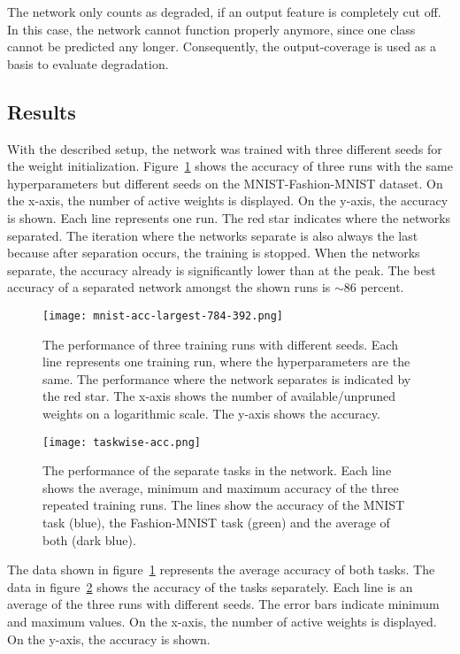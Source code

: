 The network only counts as degraded, if an output feature is completely cut off.
In this case, the network cannot function properly anymore, since one class cannot be predicted any longer.
Consequently, the output-coverage is used as a basis to evaluate degradation.

\subsection{Results}
With the described setup, the network was trained with three different seeds for the weight initialization.
Figure~\ref{fig:mnist-acc} shows the accuracy of three runs with the same hyperparameters but different seeds on the MNIST-Fashion-MNIST dataset.
On the x-axis, the number of active weights is displayed.
On the y-axis, the accuracy is shown.
Each line represents one run.
The red star indicates where the networks separated.
The iteration where the networks separate is also always the last because after separation occurs, the training is stopped.
When the networks separate, the accuracy already is significantly lower than at the peak.
The best accuracy of a separated network amongst the shown runs is $\sim86$ percent.

\begin{figure}
    \centering
    \texttt{[image: mnist-acc-largest-784-392.png]}
    \caption[Performance and Separation on MNIST-Fashion-MNIST]{The performance of three training runs with different seeds. 
    Each line represents one training run, where the hyperparameters are the same.
    The performance where the network separates is indicated by the red star.
    The x-axis shows the number of available/unpruned weights on a logarithmic scale.
    The y-axis shows the accuracy.
    }\label{fig:mnist-acc}
\end{figure}

\begin{figure}
    \centering
    \texttt{[image: taskwise-acc.png]}
    \caption[Taskwise performance]{
        The performance of the separate tasks in the network.
        Each line shows the average, minimum and maximum accuracy of the three repeated training runs.
        The lines show the accuracy of the MNIST task (blue), the Fashion-MNIST task (green) and the average of both (dark blue).
    }\label{fig:taskwise-acc}
\end{figure}

The data shown in figure~\ref{fig:mnist-acc} represents the average accuracy of both tasks.
The data in figure~\ref{fig:taskwise-acc} shows the accuracy of the tasks separately.
Each line is an average of the three runs with different seeds.
The error bars indicate minimum and maximum values.
On the x-axis, the number of active weights is displayed.
On the y-axis, the accuracy is shown.

